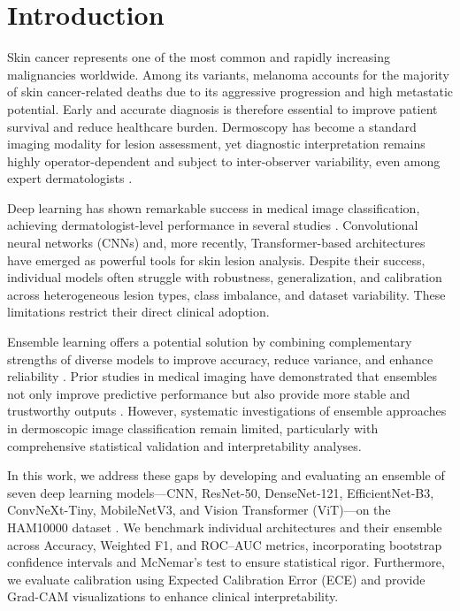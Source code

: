 \documentclass[preprint,12pt]{elsarticle}
\begin{document}
\section{Introduction}

Skin cancer represents one of the most common and rapidly increasing malignancies worldwide. Among its variants, melanoma accounts for the majority of skin cancer-related deaths due to its aggressive progression and high metastatic potential. Early and accurate diagnosis is therefore essential to improve patient survival and reduce healthcare burden. Dermoscopy has become a standard imaging modality for lesion assessment, yet diagnostic interpretation remains highly operator-dependent and subject to inter-observer variability, even among expert dermatologists \citep{tschandl2018ham10000}.

Deep learning has shown remarkable success in medical image classification, achieving dermatologist-level performance in several studies \citep{esteva2017dermatologist}. Convolutional neural networks (CNNs) and, more recently, Transformer-based architectures have emerged as powerful tools for skin lesion analysis. Despite their success, individual models often struggle with robustness, generalization, and calibration across heterogeneous lesion types, class imbalance, and dataset variability. These limitations restrict their direct clinical adoption.

Ensemble learning offers a potential solution by combining complementary strengths of diverse models to improve accuracy, reduce variance, and enhance reliability \cite{dietterich2000ensemble}. Prior studies in medical imaging have demonstrated that ensembles not only improve predictive performance but also provide more stable and trustworthy outputs \citep{valverde2021ensembles}. However, systematic investigations of ensemble approaches in dermoscopic image classification remain limited, particularly with comprehensive statistical validation and interpretability analyses.

In this work, we address these gaps by developing and evaluating an ensemble of seven deep learning models---CNN, ResNet-50, DenseNet-121, EfficientNet-B3, ConvNeXt-Tiny, MobileNetV3, and Vision Transformer (ViT)---on the HAM10000 dataset \cite{tschandl2018ham10000}. We benchmark individual architectures and their ensemble across Accuracy, Weighted F1, and ROC--AUC metrics, incorporating bootstrap confidence intervals and McNemar’s test to ensure statistical rigor. Furthermore, we evaluate calibration using Expected Calibration Error (ECE) and provide Grad-CAM visualizations to enhance clinical interpretability.
\end{document}
